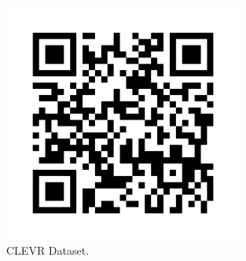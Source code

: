 \documentclass[paperwidth=36in,paperheight=48in,portrait,fontscale=0.36]{baposter}
\begin{document}
\begin{poster}
{\begin{minipage}[H]{0.3\textwidth}
\begin{figure}[H]
		\end{figure}
	\end{minipage}
	\hfill
	\begin{minipage}[H]{0.3\textwidth}
		\begin{figure}[H]
			\includegraphics[width=0.7\textwidth]{../img/clevr_qr_code.png}
			\vspace{-15pt}
			\caption*{CLEVR Dataset.}
			\label{fig:qr_clevr}
		\end{figure}
	\end{minipage}
	\hfill\null
}


\end{poster}
\end{document}
